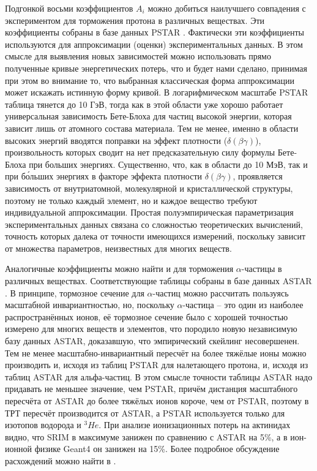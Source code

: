 \documentclass[a4paper,12pt]{article}
\begin{document}
\begin{large}
  Подгонкой восьми коэффициентов $A_i$ можно добиться наилучшего совпадения с экспериментом для торможения протона в различных веществах. Эти коэффициенты собраны в базе данных PSTAR \cite{PSTAR}.
  Фактически эти коэффициенты используются для аппроксимации (оценки) экспериментальных данных.
  В этом смысле для выявления новых зависимостей можно использовать прямо полученные кривые энергетических потерь, что и будет нами сделано, принимая при этом во внимание то, что выбранная классическая форма аппроксимации может искажать истинную форму кривой.
  В логарифмическом масштабе PSTAR таблица тянется до 10 ГэВ, тогда как в этой области уже хорошо работает универсальная зависимость Бете-Блоха для частиц высокой энергии, которая зависит лишь от атомного состава материала.
  Тем не менее, именно в области высоких энергий вводятся поправки на эффект плотности ($\delta(\beta\gamma)$), произвольность которых сводит на нет предсказательную силу формулы Бете-Блоха при больших энергиях.
  Существенно, что, как в области до 10 МэВ, так и при б\'{о}льших энергиях в факторе эффекта плотности $\delta(\beta\gamma)$, проявляется зависимость от внутриатомной, молекулярной и кристаллической структуры, поэтому не только каждый элемент, но и каждое вещество требуют индивидуальной аппроксимации.
  Простая полуэмпирическая параметризация экспериментальных данных связана со сложностью теоретических вычислений, точность которых далека от точности имеющихся измерений, поскольку зависит от множества параметров, неизвестных для многих веществ.

  Аналогичные коэффициенты можно найти и для торможения $\alpha$-частицы в различных веществах.
  Соответствующие таблицы собраны в базе данных ASTAR \cite{ASTAR}.
  В принципе, тормозное сечение для $\alpha$-частиц можно рассчитать пользуясь масштабной инвариантностью, но, поскольку $\alpha$-частица -- это один из наиболее распространённых ионов, её тормозное сечение было с хорошей точностью измерено для многих веществ и элементов, что породило новую независимую базу данных ASTAR, доказавшую, что эмпирический скейлинг несовершенен.
  Тем не менее масштабно-инвариантный пересчёт на более тяжёлые ионы можно производить и, исходя из таблиц PSTAR для налетающего протона, и, исходя из таблиц ASTAR для альфа-частиц.
  В этом смысле точности таблицы ASTAR надо придавать не меньшее значение, чем PSTAR, причём дистанция масштабного пересчёта от ASTAR до более тяжёлых ионов короче, чем от PSTAR, поэтому в ТРТ пересчёт производится от ASTAR, а PSTAR используется только для изотопов водорода и $^3He$.
  При анализе ионизационных потерь на актинидах видно, что SRIM в максимуме занижен по сравнению с ASTAR на 5\%, а в ион-ионной физике Geant4 он занижен на 15\%.
  Более подробное обсуждение расхождений можно найти в \cite{70/241-T}.


\end{large}
\end{document}
